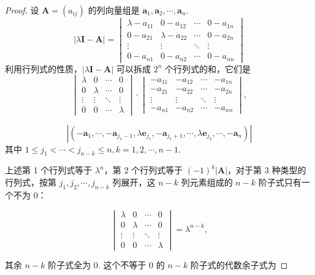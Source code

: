 \documentclass[12pt, a4paper]{ctexart}
\begin{document}
\begin{proof}
	设 $ \bm A = (a_{ij}) $ 的列向量组是 $ \boldsymbol{a}_1, \boldsymbol{a}_2, \cdots, \boldsymbol{a}_n $.
	\[
	|\lambda\bm{I} - \bm A| = \begin{vmatrix}
		\lambda - a_{11} & 0 - a_{12} & \cdots & 0 - a_{1n} \\
		0 - a_{21} & \lambda - a_{22} & \cdots & 0 - a_{2n} \\
		\vdots & \vdots & \ddots & \vdots \\
		0 - a_{n1} & 0 - a_{n2} & \cdots & 0 - a_{nn}
	\end{vmatrix}
	\]
	利用行列式的性质，$ |\lambda\bm{I} - \bm A| $ 可以拆成 $ 2^n $ 个行列式的和，它们是
	\[
	\begin{vmatrix}
		\lambda & 0 & \cdots & 0 \\
		0 & \lambda & \cdots & 0 \\
		\vdots & \vdots & \ddots & \vdots \\
		0 & 0 & \cdots & \lambda
	\end{vmatrix} \cdot \begin{vmatrix}
		-a_{11} & -a_{12} & \cdots & -a_{1n} \\
		-a_{21} & -a_{22} & \cdots & -a_{2n} \\
		\vdots & \vdots & \ddots & \vdots \\
		-a_{n1} & -a_{n2} & \cdots & -a_{nn}
	\end{vmatrix},
	\]
	
	\[
	|(-\boldsymbol{a}_1, \cdots, -\boldsymbol{a}_{j_1-1}, \lambda \boldsymbol{e}_{j_1}, -\boldsymbol{a}_{j_1+1}, \cdots, \lambda \boldsymbol{e}_{j_2}, \cdots, -\boldsymbol{a}_n)|
	\]
	其中 $ 1 \leqslant j_1 < \cdots < j_{n-k} \leqslant n, k = 1, 2, \cdots, n-1 $.
	
	上述第 1 个行列式等于 $ \lambda^n $，第 2 个行列式等于 $ (-1)^k |\bm A| $，对于第 3 种类型的行列式，按第 $ j_1, j_2, \cdots, j_{n-k} $ 列展开，这 $ n-k $ 列元素组成的 $ n-k $ 阶子式只有一个不为 0：
	
	\[
	\begin{vmatrix}
		\lambda & 0 & \cdots & 0 \\
		0 & \lambda & \cdots & 0 \\
		\vdots & \vdots & \ddots & \vdots \\
		0 & 0 & \cdots & \lambda
	\end{vmatrix} = \lambda^{n-k},
	\]
	
	其余 $ n-k $ 阶子式全为 0. 这个不等于 0 的 $ n-k $ 阶子式的代数余子式为
	

\end{proof}
\end{document}
